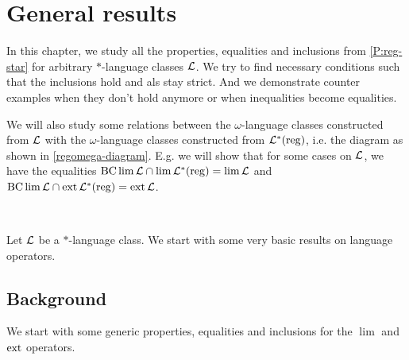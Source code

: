 \section{General results}
\label{general-results}

In this chapter, we study all the properties, equalities and inclusions from \cref{P:reg-star} for arbitrary $*$-language classes $\mathcal{L}$. We try to find necessary conditions such that the inclusions hold and als stay strict. And we demonstrate counter examples when they don't hold anymore or when inequalities become equalities.

We will also study some relations between the $\omega$-language classes constructed from $\mathcal{L}$ with the $\omega$-language classes constructed from $\mathcal{L}^*(\textup{\textrm{reg}})$, i.e. the diagram as shown in \cref{regomega-diagram}. E.g. we will show that for some cases on $\mathcal{L}$, we have the equalities $\operatorname{BC} \lim \mathcal{L} \cap \lim \mathcal{L}^*(\textup{\textrm{reg}}) = \lim \mathcal{L}$ and $\operatorname{BC} \lim \mathcal{L} \cap \operatorname{ext} \mathcal{L}^*(\textup{\textrm{reg}}) = \operatorname{ext} \mathcal{L}$.


\

Let $\mathcal{L}$ be a $*$-language class. We start with some very basic results on language operators.

\subsection{Background}
We start with some generic properties, equalities and inclusions for the $\lim$ and $\operatorname{ext}$ operators.

